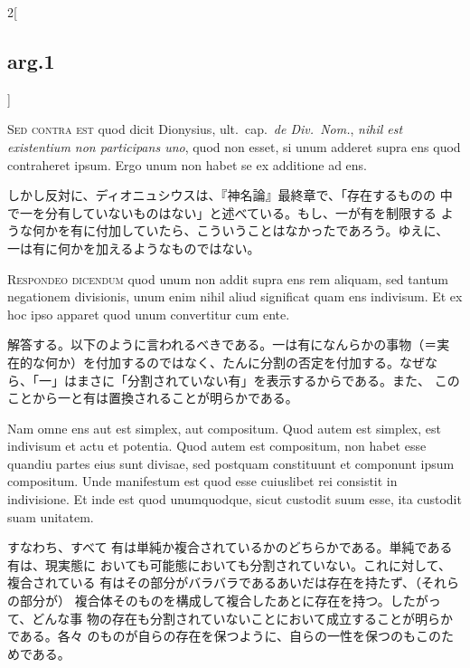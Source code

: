 \documentclass[paper=a4paper,fontsize=10pt,jafontsize=9pt,titlepage]{jlreq}
\begin{document}
\begin{paracol}{2}[\subsection{arg.1}]
\switchcolumn*[\subsection{s.c.}]

{\scshape Sed contra est} quod dicit Dionysius, ult.~cap.~{\itshape de Div.~Nom.}, {\itshape nihil est
existentium non participans uno}, quod non esset, si unum adderet supra
ens quod contraheret ipsum. Ergo unum non habet se ex additione ad ens.

\switchcolumn

しかし反対に、ディオニュシウスは、『神名論』最終章で、「存在するものの
中で一を分有していないものはない」と述べている。もし、一が有を制限する
ような何かを有に付加していたら、こういうことはなかったであろう。ゆえに、
一は有に何かを加えるようなものではない。


{\scshape Respondeo dicendum} quod unum non addit supra ens rem aliquam,
sed tantum negationem divisionis, unum enim nihil aliud significat
quam ens indivisum. Et ex hoc ipso apparet quod unum convertitur cum
ente.

\switchcolumn

解答する。以下のように言われるべきである。一は有になんらかの事物（＝実
在的な何か）を付加するのではなく、たんに分割の否定を付加する。なぜな
ら、「一」はまさに「分割されていない有」を表示するからである。また、
このことから一と有は置換されることが明らかである。

\switchcolumn*

Nam omne ens aut est simplex, aut compositum. Quod autem est
simplex, est indivisum et actu et potentia. Quod autem est compositum,
non habet esse quandiu partes eius sunt divisae, sed postquam
constituunt et componunt ipsum compositum. Unde manifestum est quod
esse cuiuslibet rei consistit in indivisione. Et inde est quod
unumquodque, sicut custodit suum esse, ita custodit suam unitatem.

\switchcolumn

すなわち、すべて
有は単純か複合されているかのどちらかである。単純である有は、現実態に
おいても可能態においても分割されていない。これに対して、複合されている
有はその部分がバラバラであるあいだは存在を持たず、（それらの部分が）
複合体そのものを構成して複合したあとに存在を持つ。したがって、どんな事
物の存在も分割されていないことにおいて成立することが明らかである。各々
のものが自らの存在を保つように、自らの一性を保つのもこのためである。


\end{paracol}
\end{document}
